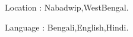 \documentclass{deedy-resume-openfont}
\begin{document}
\begin{minipage}[t]{0.66\textwidth}
\begin{tightemize}
\item Location : Nabadwip,WestBengal.
\item  Language : Bengali,English,Hindi.


\end{tightemize}
\sectionsep







\renewcommand\refname{\vskip -1.5em} %

\nocite{*}

\end{minipage} 
\end{document}
